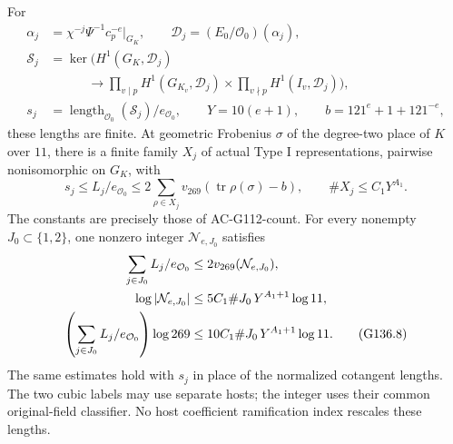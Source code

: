 \begin{theorem}
For
\[
 \begin{split}
 \alpha_j&=\chi^{-j}\Psi^{-1}c_p^{-e}|_{G_K},\qquad
 \mathcal D_j=(E_0/\mathcal O_0)(\alpha_j),\\
 \mathcal S_j&=\ker\bigl(H^1(G_K,\mathcal D_j)\\
 &\hspace{3em}\longrightarrow
 \prod_{v\mid p}H^1(G_{K_v},\mathcal D_j)
 \times\prod_{v\nmid p}H^1(I_v,\mathcal D_j)\bigr),\\
 s_j&=\operatorname{length}_{\mathcal O_0}(\mathcal S_j)/
                                  e_{\mathcal O_0},
 \qquad Y=10(e+1),\qquad b=121^e+1+121^{-e},
 \end{split}
 \tag{G136.6}
\]
these lengths are finite.  At geometric Frobenius \(\sigma\)
of the degree-two place of \(K\) over \(11\), there is a finite
family \(X_j\) of actual Type I representations, pairwise
nonisomorphic on \(G_K\), with
\[
 s_j\le L_j/e_{\mathcal O_0}
 \le2\sum_{\rho\in X_j}
            v_{269}(\operatorname{tr}\rho(\sigma)-b),
 \qquad \#X_j\le C_1Y^{A_1}.
 \tag{G136.7}
\]
The constants are precisely those of AC-G112-count.
For every nonempty \(J_0\subset\{1,2\}\), one nonzero integer
\(\mathcal N_{e,J_0}\) satisfies
\begin{align}
 \sum_{j\in J_0}L_j/e_{\mathcal O_0}
      &\le2v_{269}(\mathcal N_{e,J_0}),\notag\\
 \log|\mathcal N_{e,J_0}|
      &\le5C_1\#J_0\,Y^{A_1+1}\log11,\notag\\
 \left(\sum_{j\in J_0}L_j/e_{\mathcal O_0}\right)\log269
      &\le10C_1\#J_0\,Y^{A_1+1}\log11.
 \tag{G136.8}
\end{align}
The same estimates hold with \(s_j\) in place of the normalized
cotangent lengths.  The two cubic labels may use separate hosts;
the integer uses their common original-field classifier.
No host coefficient ramification index rescales these lengths.
\end{theorem}

